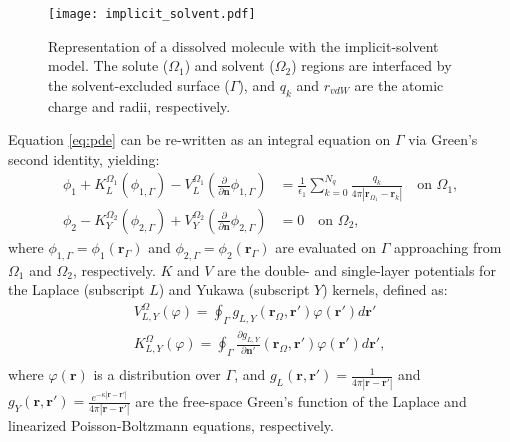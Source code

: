 %
\begin{figure}
\centering
\texttt{[image: implicit\_solvent.pdf]}
\caption{Representation of a dissolved molecule with the implicit-solvent model. The solute ($\Omega_1$) and solvent ($\Omega_2$) regions are interfaced by the solvent-excluded surface ($\Gamma$), and $q_k$ and $r_{vdW}$ are the atomic charge and radii, respectively.}
\label{fig:implicit_solvent}
\end{figure}

Equation \eqref{eq:pde} can be re-written as an integral equation on $\Gamma$ via Green's second identity, yielding:
%
\begin{align} \label{eq:volume_potential}
\phi_{1}+ K_{L}^{\Omega_1}(\phi_{1,\Gamma}) -  V_{L}^{\Omega_1} \left(\frac{\partial}{\partial \mathbf{n}}  \phi_{1,\Gamma}  \right) & = \frac{1}{\epsilon_1} \sum_{k=0}^{N_q}  \frac{q_k}{4\pi|\mathbf{r}_{\Omega_1} - \mathbf{r}_k|}  \quad \text{on $\Omega_1$,} \nonumber \\
\phi_{2} - K_{Y}^{\Omega_2}(\phi_{2,\Gamma}) + V_{Y}^{\Omega_2} \left( \frac{\partial}{\partial \mathbf{n}} \phi_{2,\Gamma} \right) & = 0 \quad \text{on $\Omega_2$,}
\end{align}
%
where $\phi_{1,\Gamma} = \phi_1(\mathbf{r}_\Gamma)$ and $\phi_{2,\Gamma} = \phi_2(\mathbf{r}_\Gamma)$ are evaluated on $\Gamma$ approaching from $\Omega_1$ and $\Omega_2$, respectively. $K$ and $V$ are the double- and single-layer potentials for the Laplace (subscript $L$) and Yukawa (subscript $Y$) kernels, defined as:
%
\begin{align}\label{eq:single_double}
V^\Omega_{L,Y}(\varphi) = \oint_\Gamma g_{L,Y}(\mathbf{r}_\Omega,\mathbf{r}')\varphi(\mathbf{r}')d\mathbf{r}'\nonumber\\
K^\Omega_{L,Y}(\varphi) = \oint_\Gamma \frac{\partial g_{L,Y}}{\partial\mathbf{n}'}(\mathbf{r}_\Omega,\mathbf{r}')\varphi(\mathbf{r}')d\mathbf{r}',\nonumber\\
\end{align}
%
where $\varphi(\mathbf{r})$ is a distribution over $\Gamma$, and $g_L(\mathbf{r},\mathbf{r}')=\frac{1}{4\pi|\mathbf{r}-\mathbf{r}'|}$ and $g_Y(\mathbf{r},\mathbf{r}')=\frac{e^{-\kappa|\mathbf{r}-\mathbf{r}'|}}{4\pi|\mathbf{r}-\mathbf{r}'|}$ are the free-space Green's function of the Laplace and linearized Poisson-Boltzmann equations, respectively. 

